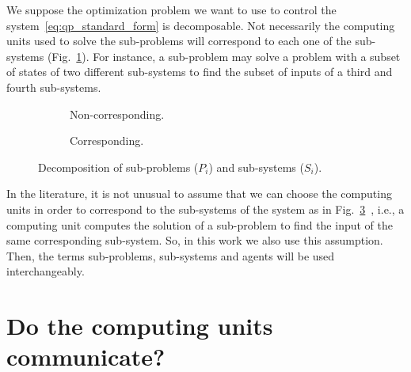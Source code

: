 \documentclass[../main.tex]{subfiles}
\begin{document}
We suppose the optimization problem we want to use to control the system~\eqref{eq:qp_standard_form} is decomposable.
Not necessarily the computing units used to solve the sub-problems will correspond to each one of the sub-systems (Fig.~\ref{fig:noncorresponding_division_system_problem}).
For instance, a sub-problem may solve a problem with a subset of states of two different sub-systems to find the subset of inputs of a third and fourth sub-systems.

\begin{figure}[h] \centering
  \begin{subfigure}{.4\textwidth}
    \centering
    \def\svgwidth{.8\textwidth}
    
    \caption{Non-corresponding.}\label{fig:noncorresponding_division_system_problem}
  \end{subfigure} \hfill
  \begin{subfigure}{.4\textwidth} \centering
    \def\svgwidth{.8\textwidth}
    
    \caption{Corresponding.}\label{fig:corresponding_division_system_problem}
  \end{subfigure}
  \caption{Decomposition of sub-problems ($P_i$) and
    sub-systems ($S_{i}$).}
\end{figure}

In the literature, it is not unusual to assume that we can choose the computing units in order to correspond to the sub-systems of the system as in Fig.~\ref{fig:corresponding_division_system_problem}~\cite{ArauzEtAl2021}, i.e., a computing unit computes the solution of a sub-problem to find the input of the same corresponding sub-system.
So, in this work we also use this assumption.
Then, the terms sub-problems, sub-systems and agents will be used interchangeably.

\section{Do the computing units communicate?}
\end{document}
